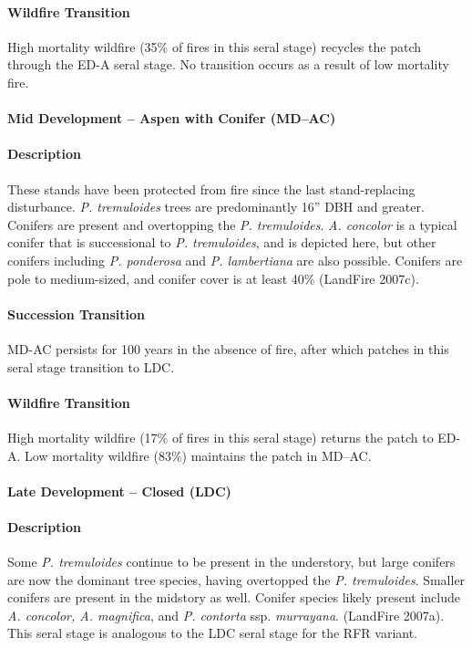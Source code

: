 \paragraph{Wildfire Transition} High mortality wildfire (35\% of fires in this seral stage) recycles the patch through the ED-A seral stage. No transition occurs as a result of low mortality fire.

\noindent\hrulefill

\paragraph{Mid Development – Aspen with Conifer (MD–AC)}

\paragraph{Description} These stands have been protected from fire since the last stand-replacing disturbance. \emph{P. tremuloides} trees are predominantly 16'' DBH and greater. Conifers are present and overtopping the \emph{P. tremuloides}. \emph{A. concolor} is a typical conifer that is successional to \emph{P. tremuloides}, and is depicted here, but other conifers including \emph{P. ponderosa} and \emph{P. lambertiana} are also possible. Conifers are pole to medium-sized, and conifer cover is at least 40\% (LandFire 2007c).

\paragraph{Succession Transition} MD-AC persists for 100 years in the absence of fire, after which patches in this seral stage transition to LDC. 

\paragraph{Wildfire Transition} High mortality wildfire (17\% of fires in this seral stage) returns the patch to ED-A. Low mortality wildfire (83\%) maintains the patch in MD–AC.

\noindent\hrulefill

\paragraph{Late Development – Closed (LDC)}

\paragraph{Description} Some \emph{P. tremuloides} continue to be present in the understory, but large conifers are now the dominant tree species, having overtopped the \emph{P. tremuloides}. Smaller conifers are present in the midstory as well. Conifer species likely present include \emph{A. concolor, A. magnifica}, and \emph{P. contorta} ssp. \emph{murrayana}. (LandFire 2007a). This seral stage is analogous to the LDC seral stage for the RFR variant.

